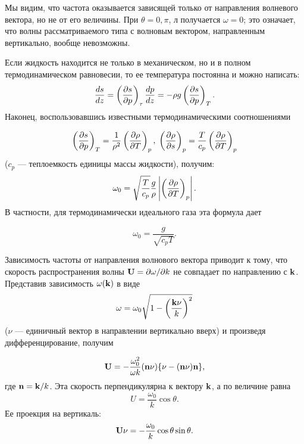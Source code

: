 Мы видим, что частота оказывается зависящей только от направления волневого
вектора, но не от его величины. При $\theta = 0,\pi$, л получается $\omega = 0$;
это означает, что волны рассматриваемого типа с волновым вектором, направленным
вертикально, вообще невозможны.

Если жидкость находится не только в механическом, но и в полном
термодинамическом равновесии, то ее температура постоянна и можно написать:
\[
   \frac{d{s}}{d{z}} = \left( \frac{\partial{s}}{\partial{p}} \right)_{\tau}\frac{d{p}}{d{z}} = - \rho g \left( \frac{\partial{s}}{\partial{p}} \right)_{T}.
\]
Наконец, воспользовавшись известными термодинамическими соотношениями

\[
   \left( \frac{\partial{s}}{\partial{p}} \right)_{T} = \frac1{\rho^2}\left( \frac{\partial{\rho}}{\partial{T}} \right)_{p},\;
   \left( \frac{\partial{\rho}}{\partial{s}} \right)_{p} = \frac{T}{c_p}\left( \frac{\partial{\rho}}{\partial{T}} \right)_{p}
\]
($c_p$ — теплоемкость единицы массы жидкости), получим:
\begin{equation}
   \label{eq:13.7}
   \omega_0 = \sqrt{\frac{T}{c_p}}\frac{g}{\rho}\left\vert \left( \frac{\partial{\rho}}{\partial{T}} \right)_{p} \right\vert .
\end{equation}
В частности, для термодинамически идеального газа эта формула дает

\begin{equation}
   \label{eq:13.8}
   \omega_0 = \frac{g}{\sqrt{c_p T}}.
\end{equation}

Зависимость частоты от направления волнового вектора приводит к тому, что
скорость распространения волны $\mathbf{U} = \partial \omega/\partial k$ не
совпадает по направлению с $\mathbf{k}$. Представив зависимость $\omega (\mathbf{k})$
в виде
\[
   \omega = \omega_0\sqrt{1-\left( \frac{\mathbf{k\nu}}{k} \right)^2}
\]
($\nu$ — единичный вектор в направлении вертикально вверх) и произведя
дифференцирование, получим

\begin{equation}
   \label{eq:13.9}
   \mathbf{U} = - \frac{\omega^2_0}{\omega k} (\mathbf{n \nu})
   \lbrace \mathbf{\nu - (n\nu)n} \rbrace,
\end{equation}
где $\mathbf{n} = \mathbf{k}/k$. Эта скорость перпендикулярна к вектору $\mathbf{k}$, а
по величине равна
\[
   U = \frac{\omega_0}{k}\cos\theta.
\]
Ее проекция на вертикаль:
\[
   \mathbf{U\nu} = - \frac{\omega_0}{k}\cos\theta\sin\theta.
\]



